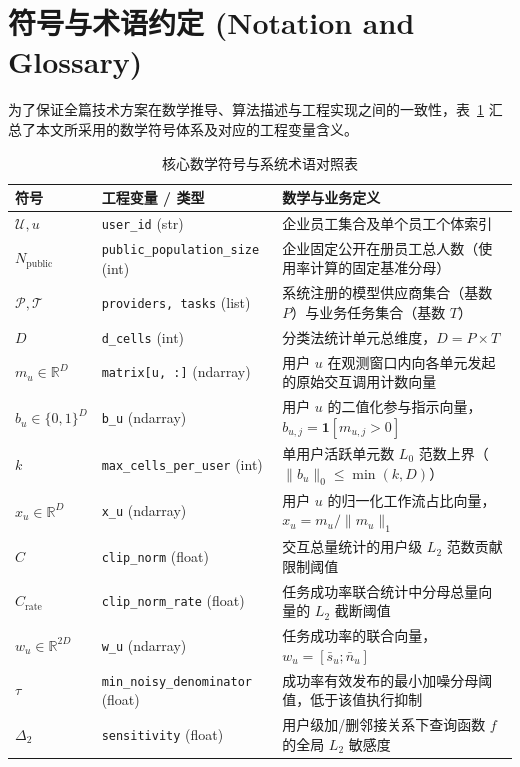 \section*{符号与术语约定 (Notation and Glossary)}

为了保证全篇技术方案在数学推导、算法描述与工程实现之间的一致性，表~\ref{tab:notation} 汇总了本文所采用的数学符号体系及对应的工程变量含义。

\begin{table}[htbp]
\centering
\small
\caption{核心数学符号与系统术语对照表}
\label{tab:notation}
\begin{tabularx}{\textwidth}{llX}
\toprule
\textbf{符号} & \textbf{工程变量 / 类型} & \textbf{数学与业务定义} \\
\midrule
$\mathcal{U}, u$ & \texttt{user\_id} (str) & 企业员工集合及单个员工个体索引 \\
$N_{\text{public}}$ & \texttt{public\_population\_size} (int) & 企业固定公开在册员工总人数（使用率计算的固定基准分母） \\
$\mathcal{P}, \mathcal{T}$ & \texttt{providers, tasks} (list) & 系统注册的模型供应商集合（基数 $P$）与业务任务集合（基数 $T$） \\
$D$ & \texttt{d\_cells} (int) & 分类法统计单元总维度，$D = P \times T$ \\
$m_u \in \mathbb{R}^D$ & \texttt{matrix[u, :]} (ndarray) & 用户 $u$ 在观测窗口内向各单元发起的原始交互调用计数向量 \\
$b_u \in \{0, 1\}^D$ & \texttt{b\_u} (ndarray) & 用户 $u$ 的二值化参与指示向量，$b_{u,j} = \mathbf{1}[m_{u,j} > 0]$ \\
$k$ & \texttt{max\_cells\_per\_user} (int) & 单用户活跃单元数 $L_0$ 范数上界（$\|b_u\|_0 \le \min(k, D)$） \\
$x_u \in \mathbb{R}^D$ & \texttt{x\_u} (ndarray) & 用户 $u$ 的归一化工作流占比向量，$x_u = m_u / \|m_u\|_1$ \\
$C$ & \texttt{clip\_norm} (float) & 交互总量统计的用户级 $L_2$ 范数贡献限制阈值 \\
$C_{\text{rate}}$ & \texttt{clip\_norm\_rate} (float) & 任务成功率联合统计中分母总量向量的 $L_2$ 截断阈值 \\
$w_u \in \mathbb{R}^{2D}$ & \texttt{w\_u} (ndarray) & 任务成功率的联合向量，$w_u = [\bar{s}_u ; \bar{n}_u]$ \\
$\tau$ & \texttt{min\_noisy\_denominator} (float) & 成功率有效发布的最小加噪分母阈值，低于该值执行抑制 \\
$\Delta_2$ & \texttt{sensitivity} (float) & 用户级加/删邻接关系下查询函数 $f$ 的全局 $L_2$ 敏感度 \\

\end{tabularx}
\end{table}
